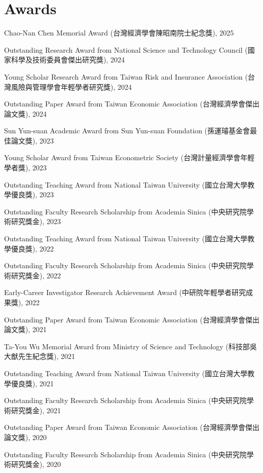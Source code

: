 \documentclass[10pt,letterpaper]{article}
\renewenvironment{itemize}{
  \begin{list}{}{
      \setlength{\leftmargin}{1.5em}
      \setlength{\itemsep}{0.25em}
      \setlength{\parskip}{0pt}
      \setlength{\parsep}{0.25em}
    }
}{
  \end{list}
}
\begin{document}
 



 
 



\section*{\textbf{Awards}}

\begin{itemize}
	\item Chao-Nan Chen Memorial Award (台灣經濟學會陳昭南院士紀念獎), 2025
    \item 	Outstanding Research Award from National Science and Technology Council (國家科學及技術委員會傑出研究獎), 2024
	\item Young Scholar Research Award from Taiwan Risk and Insurance Association (台灣風險與管理學會年輕學者研究獎), 2024
		\item Outstanding Paper Award from Taiwan Economic Association (台灣經濟學會傑出論文獎), 2024
	\item Sun Yun-suan Academic Award from Sun Yun-suan Foundation (孫運璿基金會最佳論文獎), 2023
	\item Young Scholar Award from Taiwan Econometric Society (台灣計量經濟學會年輕學者獎), 2023
	\item Outstanding Teaching Award from National Taiwan University (國立台灣大學教學優良獎), 2023	
	\item Outstanding Faculty Research Scholarship from Academia Sinica (中央研究院學術研究獎金), 2023
	\item Outstanding Teaching Award from National Taiwan University (國立台灣大學教學優良獎), 2022
	\item Outstanding Faculty Research Scholarship from Academia Sinica (中央研究院學術研究獎金), 2022
	\item Early-Career Investigator Research Achievement Award (中研院年輕學者研究成果獎), 2022		
	\item Outstanding Paper Award from Taiwan Economic Association (台灣經濟學會傑出論文獎), 2021
	\item Ta-You Wu Memorial Award from Ministry of Science and Technology (科技部吳大猷先生紀念獎), 2021
	\item Outstanding Teaching Award from National Taiwan University (國立台灣大學教學優良獎), 2021
	\item Outstanding Faculty Research Scholarship from Academia Sinica (中央研究院學術研究獎金), 2021
	\item Outstanding Paper Award from Taiwan Economic Association (台灣經濟學會傑出論文獎), 2020
	\item Outstanding Faculty Research Scholarship from Academia Sinica (中央研究院學術研究獎金), 2020
\end{itemize}
\end{document}
